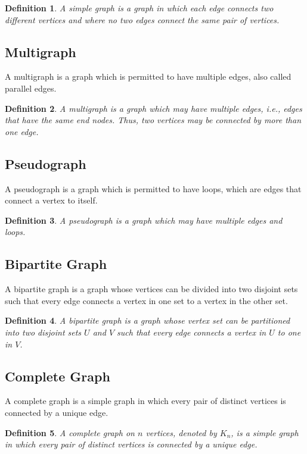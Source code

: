 \documentclass{article}
\newtheorem{definition}{Definition}
\begin{document}
\begin{definition}
	A \textit{simple graph} is a graph in which each edge connects two different vertices and where no two edges connect the same pair of vertices.
\end{definition}

\subsection{Multigraph}
A multigraph is a graph which is permitted to have multiple edges, also called parallel edges.

\begin{definition}
	A \textit{multigraph} is a graph which may have multiple edges, i.e., edges that have the same end nodes. Thus, two vertices may be connected by more than one edge.
\end{definition}

\subsection{Pseudograph}
A pseudograph is a graph which is permitted to have loops, which are edges that connect a vertex to itself.

\begin{definition}
	A \textit{pseudograph} is a graph which may have multiple edges and loops.
\end{definition}

\subsection{Bipartite Graph}
A bipartite graph is a graph whose vertices can be divided into two disjoint sets such that every edge connects a vertex in one set to a vertex in the other set.

\begin{definition}
	A \textit{bipartite graph} is a graph whose vertex set can be partitioned into two disjoint sets \(U\) and \(V\) such that every edge connects a vertex in \(U\) to one in \(V\).
\end{definition}

\subsection{Complete Graph}
A complete graph is a simple graph in which every pair of distinct vertices is connected by a unique edge.

\begin{definition}
	A \textit{complete graph} on \(n\) vertices, denoted by \(K_n\), is a simple graph in which every pair of distinct vertices is connected by a unique edge.
\end{definition}
\end{document}
